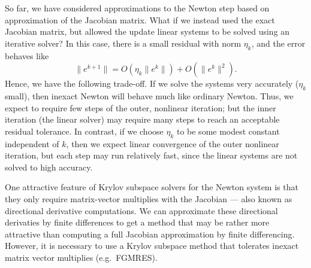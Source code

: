 \documentclass[12pt, leqno]{article} %
\begin{document}
So far, we have considered approximations to the Newton step based on
approximation of the Jacobian matrix. What if we instead used the exact
Jacobian matrix, but allowed the update linear systems to be solved
using an iterative solver? In this case, there is a small residual with
norm \(\eta_k\), and the error behaves like
\[\|e^{k+1}\| = O(\eta_k \|e^k\|) + O(\|e^k\|^2).\] Hence, we have the
following trade-off. If we solve the systems very accurately (\(\eta_k\)
small), then inexact Newton will behave much like ordinary Newton. Thus,
we expect to require few steps of the outer, nonlinear iteration; but
the inner iteration (the linear solver) may require many steps to reach
an acceptable residual tolerance. In contrast, if we choose \(\eta_k\)
to be some modest constant independent of \(k\), then we expect linear
convergence of the outer nonlinear iteration, but each step may run
relatively fast, since the linear systems are not solved to high
accuracy.

One attractive feature of Krylov subspace solvers for the Newton system
is that they only require matrix-vector multiplies with the Jacobian ---
also known as directional derivative computations. We can approximate
these directional derivaties by finite differences to get a method that
may be rather more attractive than computing a full Jacobian
approximation by finite differencing. However, it is necessary to use a
Krylov subspace method that tolerates inexact matrix vector multiplies
(e.g.~FGMRES).
\end{document}
